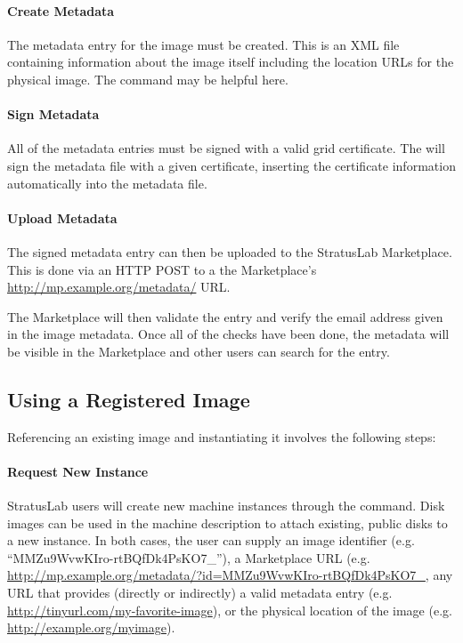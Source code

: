 \paragraph{Create Metadata} The metadata entry for the image must be
  created.  This is an XML file containing information about the image
  itself including the location URLs for the physical image.  The
   command may be helpful here.

\paragraph{Sign Metadata} All of the metadata entries must be signed with a
  valid grid certificate.  The  will sign
  the metadata file with a given certificate, inserting the
  certificate information automatically into the metadata file.

\paragraph{Upload Metadata} The signed metadata entry can then be uploaded
  to the StratusLab Marketplace\@.  This is done via an HTTP POST to a
  the Marketplace's \url{http://mp.example.org/metadata/} URL\@.

The Marketplace will then validate the entry and verify the email
address given in the image metadata.  Once all of the checks have been
done, the metadata will be visible in the Marketplace and other users
can search for the entry.

\subsection{Using a Registered Image}

Referencing an existing image and instantiating it involves the
following steps:

\paragraph{Request New Instance} StratusLab users will create new machine
  instances through the  command.  Disk
  images can be used in the machine description to attach existing,
  public disks to a new instance.  In both cases, the user can supply
  an image identifier (e.g. ``MMZu9WvwKIro-rtBQfDk4PsKO7\_''), a
  Marketplace URL
  (e.g. \url{http://mp.example.org/metadata/?id=MMZu9WvwKIro-rtBQfDk4PsKO7\_},
  any URL that provides (directly or indirectly) a valid metadata
  entry (e.g. \url{http://tinyurl.com/my-favorite-image}), or the
  physical location of the image
  (e.g. \url{http://example.org/myimage}).

